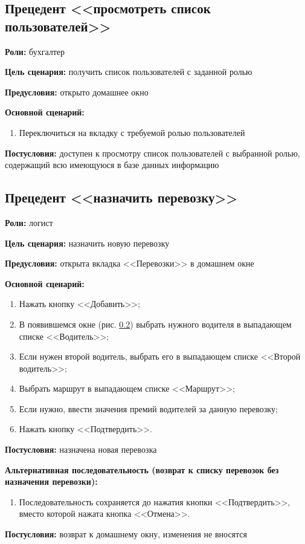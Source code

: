 \subsection{Прецедент <<просмотреть список пользователей>>}
\textbf{Роли:} бухгалтер \par
\textbf{Цель сценария:} получить список пользователей с заданной ролью \par 
\textbf{Предусловия:} открыто домашнее окно \par
\textbf{Основной сценарий:} 
\begin{enumerate}
    \item Переключиться на вкладку с требуемой ролью пользователей
\end{enumerate} \par
\textbf{Постусловия:} доступен к просмотру список пользователей
    с выбранной ролью, содержащий всю имеющуюся в базе данных информацию \par

\subsection{Прецедент <<назначить перевозку>>}
\textbf{Роли:} логист \par
\textbf{Цель сценария:} назначить новую перевозку \par
\textbf{Предусловия:} открыта вкладка <<Перевозки>> в домашнем окне \par
\textbf{Основной сценарий:} 
\begin{enumerate}
    \item Нажать кнопку <<Добавить>>;
    \item В появившемся окне (рис. \ref{}) выбрать нужного водителя 
        в выпадающем списке <<Водитель>>;
    \item Если нужен второй водитель, выбрать его
        в выпадающем списке <<Второй водитель>>;
    \item Выбрать маршрут в выпадающем списке <<Маршрут>>;
    \item Если нужно, ввести значения премий водителей за данную перевозку;
    \item Нажать кнопку <<Подтвердить>>.
\end{enumerate} \par
\textbf{Постусловия:} назначена новая перевозка \par
\textbf{Альтернативная последовательность 
    (возврат к списку перевозок без назначения перевозки):} \par
\begin{enumerate}
    \item Последовательность сохраняется до нажатия кнопки <<Подтвердить>>, 
        вместо которой нажата кнопка <<Отмена>>.
\end{enumerate} \par
\textbf{Постусловия:} возврат к домашнему окну, изменения не вносятся \par

